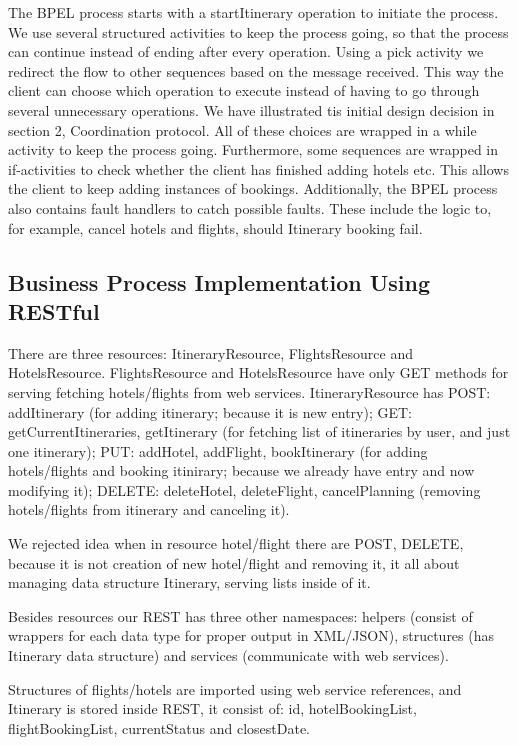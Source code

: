 \documentclass[english, a4paper, 12pt]{article}
\begin{document}
The BPEL process starts with a startItinerary operation to initiate the process. We use several structured activities to keep the process going, so that the process can continue instead of ending after every operation. Using a pick activity we redirect the flow to other sequences based on the message received. This way the client can choose which operation to execute instead of having to go through several unnecessary operations. We have illustrated tis initial design decision in section 2, Coordination protocol. All of these choices are wrapped in a while activity to keep the process going. Furthermore, some sequences are wrapped in if-activities to check whether the client has finished adding hotels etc. This allows the client to keep adding instances of bookings. Additionally, the BPEL process also contains fault handlers to catch possible faults. These include the logic to, for example, cancel hotels and flights, should Itinerary booking fail.

\subsection{Business Process Implementation Using RESTful}
There are three resources: ItineraryResource, FlightsResource and HotelsResource. FlightsResource and HotelsResource have only GET methods for serving fetching hotels/flights from web services. ItineraryResource has POST: addItinerary (for adding itinerary; because it is new entry); GET: getCurrentItineraries, getItinerary (for fetching list of itineraries by user, and just one itinerary); PUT: addHotel, addFlight, bookItinerary (for adding hotels/flights and booking itinirary; because we already have entry and now modifying it); DELETE: deleteHotel, deleteFlight, cancelPlanning (removing hotels/flights from itinerary and canceling it).

We rejected idea when in resource hotel/flight there are POST, DELETE, because it is not creation of new hotel/flight and removing it, it all about managing data structure Itinerary, serving lists inside of it.

Besides resources our REST has three other namespaces: helpers (consist of wrappers for each data type for proper output in XML/JSON), structures (has Itinerary data structure) and services (communicate with web services).

Structures of flights/hotels are imported using web service references, and Itinerary is stored inside REST, it consist of: id, hotelBookingList, flightBookingList, currentStatus and closestDate.
\end{document}
